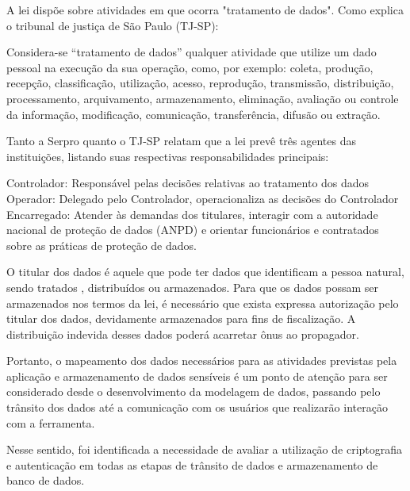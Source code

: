 \documentclass[
    12pt,               %
    openright,          %
    oneside,
    a4paper,            %
    BIBLATEX,           %
    TODO,               %
    english,            %
    brazil              %
    ]{ifsp-spo-inf-ctds}
\begin{document}
            A lei dispõe sobre atividades em que ocorra "tratamento de dados". Como explica o tribunal de justiça de São Paulo (TJ-SP):

            \begin{citacao}
                Considera-se “tratamento de dados” qualquer atividade que utilize um dado pessoal na execução da sua operação, como, por exemplo: coleta, produção, recepção, classificação, utilização, acesso, reprodução, transmissão, distribuição, processamento, arquivamento, armazenamento, eliminação, avaliação ou controle da informação, modificação, comunicação, transferência, difusão ou extração.
            \end{citacao}                                     

            Tanto a Serpro quanto o TJ-SP relatam que a lei prevê três agentes das instituições, listando suas respectivas responsabilidades principais:

            \begin{citacao}
                Controlador: Responsável pelas decisões relativas ao tratamento dos dados
                Operador: Delegado pelo Controlador, operacionaliza as decisões do Controlador
                Encarregado: Atender às demandas dos titulares, interagir com a autoridade nacional de proteção de dados (ANPD) e orientar funcionários e contratados sobre as práticas de proteção de dados.
            \end{citacao}  

            O titular dos dados é aquele que pode ter dados que identificam a pessoa natural, sendo tratados , distribuídos ou armazenados. Para que os dados possam ser armazenados nos termos da lei, é necessário que exista expressa autorização pelo titular dos dados, devidamente armazenados para fins de fiscalização. A distribuição indevida desses dados poderá acarretar ônus ao propagador. 

            Portanto, o mapeamento dos dados necessários para as atividades previstas pela aplicação e armazenamento de dados sensíveis é um ponto de atenção para ser considerado desde o desenvolvimento da modelagem de dados, passando pelo trânsito dos dados até a comunicação com os usuários que realizarão interação com a ferramenta.

            Nesse sentido, foi identificada a necessidade de avaliar a utilização de criptografia e autenticação em todas as etapas de trânsito de dados e armazenamento de banco de dados.
\end{document}
